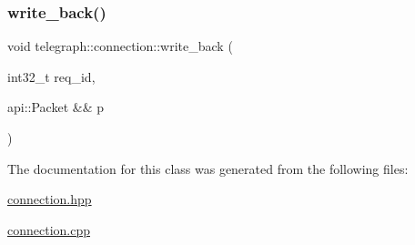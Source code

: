 \mbox{\label{classtelegraph_1_1connection_a5bf70bff51c2cd812f4f27b3e37e9060}} 
\subsubsection{\texorpdfstring{write\+\_\+back()}{write\_back()}}
{\footnotesize\ttfamily void telegraph\+::connection\+::write\+\_\+back (\begin{DoxyParamCaption}\item[{int32\+\_\+t}]{req\+\_\+id,  }\item[{api\+::\+Packet \&\&}]{p }\end{DoxyParamCaption})}



The documentation for this class was generated from the following files\+:\begin{DoxyCompactItemize}
\item 
\hyperlink{connection_8hpp}{connection.\+hpp}\item 
\hyperlink{connection_8cpp}{connection.\+cpp}\end{DoxyCompactItemize}
